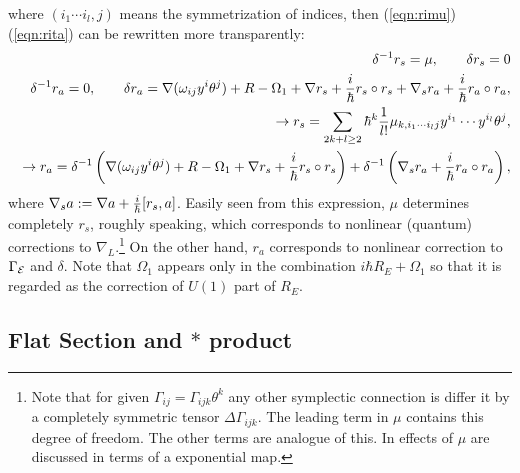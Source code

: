 \documentclass[10pt,a4paper]{article}
\def\h{\hbar}
\begin{document}
where $(i_1\cdots i_l,j)$ means the symmetrization of indices, then (\ref{eqn:rimu})(\ref{eqn:rita}) can be rewritten more transparently:
\begin{eqnarray}
&&\delta^{-1}r_s=\mu,\qquad  \delta r_s=0 \nonumber\\
&&\delta^{-1}r_a=0,\qquad \delta r_a=\nabla(\omega_{ij}y^i\theta^j)+R-\Omega_1+\nabla r_s+{i\over\h}r_s\circ r_s+\nabla_sr_a+{i\over\h}r_a\circ r_a,\nonumber\\
&&\rightarrow r_s = \sum_{2k+l\geq2}\h^k {1\over l!}\mu_{k,i_1\cdots i_l j}y^{i_1}\cdots y^{i_l}\theta^j, \nonumber\\
&&\rightarrow r_a =\delta^{-1}\left(\nabla(\omega_{ij}y^i\theta^j)+R-\Omega_1+\nabla r_s+{i\over\h}r_s\circ r_s\right)+\delta^{-1}\left(\nabla_s r_a+{i\over\h}r_a\circ r_a\right),\nonumber\\
\end{eqnarray}
where $\nabla_sa:=\nabla a+{i\over\h}[r_s,a]$. Easily seen from this expression, $\mu$ determines completely $r_s$, roughly speaking, which corresponds to nonlinear (quantum) corrections to $\nabla_L$.\footnote{
Note that for given $\Gamma_{ij}=\Gamma_{ijk}\theta^k$ any other symplectic connection is differ it by a completely symmetric tensor $\Delta\Gamma_{ijk}$. The leading term in $\mu$ contains this degree of freedom. The other terms are analogue of this. In \cite{EW} effects of $\mu$ are discussed in terms of a exponential map.} 
On the other hand, $r_a$ corresponds to nonlinear correction to $\Gamma_{\cal E}$ and $\delta$. Note that $\Omega_1$ appears only in the combination $i\h R_E+\Omega_1$ so that it is regarded as the correction of $U(1)$ part of $R_E$. \\


\subsection{Flat Section and $*$ product
\label{sec:flat}}
\end{document}
